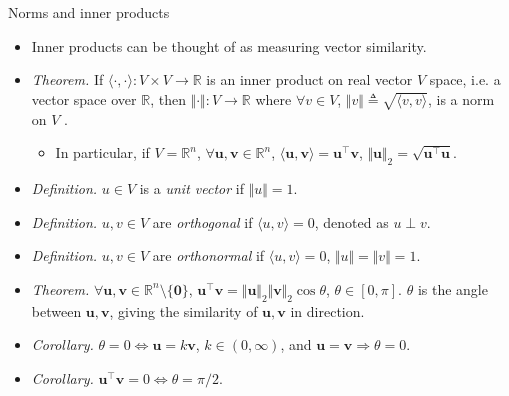 \documentclass{beamer}
\numberwithin{equation}{section}
\begin{document}
\begin{frame}{Norms and inner products}
    \begin{itemize}
        \item
        Inner products can be thought of as measuring vector similarity.

        \item
        \textit{Theorem.} If $ \langle\cdot, \cdot\rangle : V \times V
        \rightarrow \mathbb{R} $ is an inner product on real vector $ V $
        space, i.e. a vector space over $ \mathbb{R} $, then
        $ \Vert\cdot\Vert : V \rightarrow \mathbb{R} $ where
        $ \forall v \in V $, $ \Vert v\Vert \triangleq
        \sqrt{\langle v, v\rangle} $, is a norm on $ V $ \cite{jacob_linalg}.
        \begin{itemize}
            \item
            In particular, if $ V = \mathbb{R}^n $, $ \forall \mathbf{u},
            \mathbf{v} \in \mathbb{R}^n $, $ \langle\mathbf{u},
            \mathbf{v}\rangle  = \mathbf{u}^\top\mathbf{v} $,
            $ \Vert\mathbf{u}\Vert_2 = \sqrt{\mathbf{u}^\top\mathbf{u}} $.
        \end{itemize}

        \item
        \textit{Definition.} $ u \in V $ is a \textit{unit vector} if
        $ \Vert u\Vert = 1 $.        

        \item
	    \textit{Definition.} $ u, v \in V $ are \textit{orthogonal} if 
	    $ \langle u, v\rangle = 0 $, denoted as $ u \perp v $.

        \item
        \textit{Definition.} $ u, v \in V $ are \textit{orthonormal} if
        $ \langle u, v\rangle = 0 $, $ \Vert u\Vert = \Vert v\Vert = 1 $.

        \item
        \textit{Theorem.} $ \forall \mathbf{u}, \mathbf{v} \in \mathbb{R}^n
        \setminus \{\mathbf{0}\} $, $ \mathbf{u}^\top\mathbf{v} =
        \Vert\mathbf{u}\Vert_2\Vert\mathbf{v}\Vert_2\cos\theta $,
        $ \theta \in [0, \pi] $. $ \theta $ is the angle between
        $ \mathbf{u}, \mathbf{v} $, giving the similarity of $ \mathbf{u},
        \mathbf{v} $ in direction.

        \item
        \textit{Corollary.} $ \theta = 0 \Leftrightarrow
        \mathbf{u} = k\mathbf{v} $, $ k \in (0, \infty) $, and $ \mathbf{u} =
        \mathbf{v} \Rightarrow \theta = 0 $.

        \item
        \textit{Corollary.} $ \mathbf{u}^\top\mathbf{v} = 0 \Leftrightarrow
        \theta = \pi / 2 $.
    \end{itemize}
\end{frame}
\end{document}
